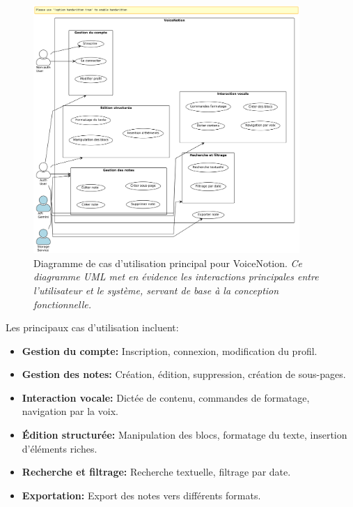         \begin{figure}[htbp]
        \centering
        \includegraphics[width=0.9\textwidth]{assets/docs/voicenotion_use_case.png}
        \caption{Diagramme de cas d'utilisation principal pour VoiceNotion. \newline\textit{Ce diagramme UML met en évidence les interactions principales entre l'utilisateur et le système, servant de base à la conception fonctionnelle.}}
        \label{fig:use_case_diagram}
    \end{figure}
    
    Les principaux cas d'utilisation incluent:
    
    \begin{itemize}
        \item \textbf{Gestion du compte:} Inscription, connexion, modification du profil.
        
        \item \textbf{Gestion des notes:} Création, édition, suppression, création de sous-pages.
        
        \item \textbf{Interaction vocale:} Dictée de contenu, commandes de formatage, navigation par la voix.
        
        \item \textbf{Édition structurée:} Manipulation des blocs, formatage du texte, insertion d'éléments riches.
        
        \item \textbf{Recherche et filtrage:} Recherche textuelle, filtrage par date.
        
        \item \textbf{Exportation:} Export des notes vers différents formats.
    \end{itemize}
    
